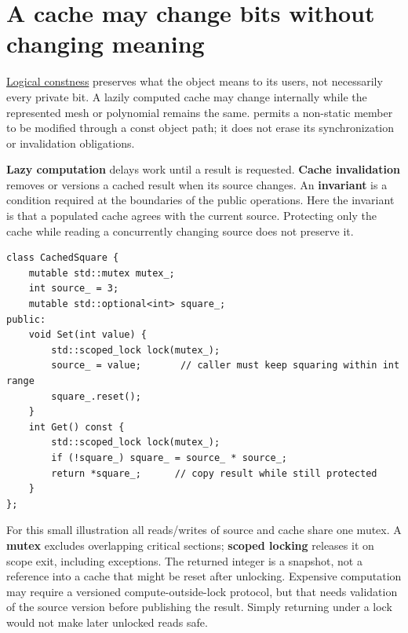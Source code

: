 \section{A cache may change bits without changing meaning}\label{01-foundations-i-ch003-a-cache-may-change-bits-without-changing-meaning}

\hypertarget{01-foundations-i-ch003-a-cache-may-change-bits-without-changing-meaning}{}

\hyperref[appendix-f5593256bcaf]{Logical constness} preserves what the object means to its users, not necessarily every private bit. A lazily computed cache may change internally while the represented mesh or polynomial remains the same.  permits a non-static member to be modified through a const object path; it does not erase its synchronization or invalidation obligations.

\textbf{Lazy computation} delays work until a result is requested. \textbf{Cache invalidation} removes or versions a cached result when its source changes. An \textbf{invariant} is a condition required at the boundaries of the public operations. Here the invariant is that a populated cache agrees with the current source. Protecting only the cache while reading a concurrently changing source does not preserve it.

\begin{verbatim}
class CachedSquare {
    mutable std::mutex mutex_;
    int source_ = 3;
    mutable std::optional<int> square_;
public:
    void Set(int value) {
        std::scoped_lock lock(mutex_);
        source_ = value;       // caller must keep squaring within int range
        square_.reset();
    }
    int Get() const {
        std::scoped_lock lock(mutex_);
        if (!square_) square_ = source_ * source_;
        return *square_;      // copy result while still protected
    }
};
\end{verbatim}

For this small illustration all reads/writes of source and cache share one mutex. A \textbf{mutex} excludes overlapping critical sections; \textbf{scoped locking} releases it on scope exit, including exceptions. The returned integer is a snapshot, not a reference into a cache that might be reset after unlocking. Expensive computation may require a versioned compute-outside-lock protocol, but that needs validation of the source version before publishing the result. Simply returning  under a lock would not make later unlocked reads safe.

